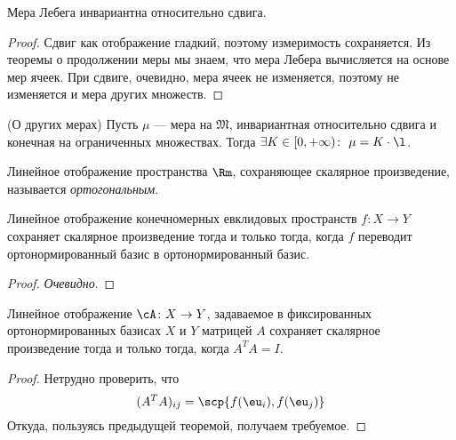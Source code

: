 \begin{corollary}
	Мера Лебега инвариантна относительно сдвига.
\end{corollary}
\begin{proof}
	Сдвиг как отображение гладкий, поэтому измеримость сохраняется. Из теоремы
	о продолжении меры мы знаем, что мера Лебера вычисляется на основе мер
	ячеек. При сдвиге, очевидно, мера ячеек не изменяется, поэтому не изменяется и мера 
	других множеств.
\end{proof}

\begin{theorem}(О других мерах)
	Пусть $\mu$ --- мера на $\mathfrak{M}$, инвариантная относительно сдвига и конечная на 
	ограниченных множествах. Тогда $\exists K \in [0, +\infty)\colon~ \mu = K \cdot \l$.
\end{theorem}

\begin{definition}
	Линейное отображение пространства $\Rm$, сохраняющее скалярное произведение, 
	называется \textit{ортогональным}.
\end{definition}

\begin{theorem}
	Линейное отображение конечномерных евклидовых пространств $f \colon X \to Y$ 
	сохраняет скалярное произведение тогда и только тогда, когда $f$ переводит 
	ортонормированный базис в ортонормированный базис.
\end{theorem}
\begin{proof}
	\textit{Очевидно}.
\end{proof}

\begin{theorem}
	Линейное отображение $\cA \colon X \to Y$, задаваемое в фиксированных 
	ортонормированных базисах $X$ и $Y$ матрицей $A$ сохраняет скалярное произведение 
	тогда и только тогда, когда $A^T A = I$.
\end{theorem}
\begin{proof}
	Нетрудно проверить, что
\[
	(A^T A)_{ij} = \scp{f(\eu_i), f(\eu_j)}
\]
	Откуда, пользуясь предыдущей теоремой, получаем требуемое.	
\end{proof}

